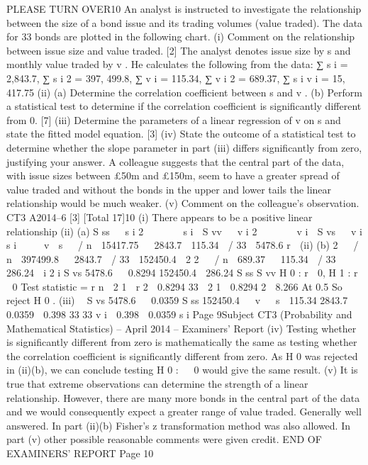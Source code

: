 PLEASE TURN OVER10
An analyst is instructed to investigate the relationship between the size of a bond issue
and its trading volumes (value traded). The data for 33 bonds are plotted in the
following chart.
(i)
Comment on the relationship between issue size and value traded.
[2]
The analyst denotes issue size by s and monthly value traded by v . He calculates the
following from the data:
∑ s i = 2,843.7, ∑ s i 2 = 397, 499.8, ∑ v i = 115.34, ∑ v i 2 = 689.37, ∑ s i v i = 15, 417.75
(ii)
(a) Determine the correlation coefficient between s and v .
(b) Perform a statistical test to determine if the correlation coefficient is
significantly different from 0.
[7]
(iii) Determine the parameters of a linear regression of v on s and state the fitted
model equation.
[3]
(iv) State the outcome of a statistical test to determine whether the slope parameter
in part (iii) differs significantly from zero, justifying your answer.
A colleague suggests that the central part of the data, with issue sizes between £50m
and £150m, seem to have a greater spread of value traded and without the bonds in
the upper and lower tails the linear relationship would be much weaker.
(v)
Comment on the colleague’s observation.
CT3 A2014–6
[3]
[Total 17]10
(i) There appears to be a positive linear relationship
(ii) (a)
S ss   s i 2   
   s i 
S vv   v i 2   
   v i 
S vs   v i s i     v  s   / n  15417.75   2843.7  115.34  / 33  5478.6
r 
(ii)
(b)
2 
 / n  397499.8   2843.7  / 33  152450.4

2
2 
 / n  689.37   115.34  / 33  286.24

i
2
i
S vs
5478.6

 0.8294
152450.4  286.24
S ss S vv
H 0 : r  0, H 1 : r  0
Test statistic = r
n  2
1  r
2

0.8294 33  2
1  0.8294
2
 8.266
At 0.5%
So reject H 0 .
(iii)

S vs
5478.6

 0.0359
S ss 152450.4
  v   s 
115.34
2843.7
 0.0359
 0.398
33
33
v i  0.398  0.0359 s i
Page 9Subject CT3 (Probability and Mathematical Statistics) – April 2014 – Examiners’ Report
(iv)
Testing whether  is significantly different from zero is mathematically the
same as testing whether the correlation coefficient is significantly different
from zero.
As H 0 was rejected in (ii)(b), we can conclude testing H 0 :   0 would give
the same result.
(v)
It is true that extreme observations can determine the strength of a linear
relationship. However, there are many more bonds in the central part of the
data and we would consequently expect a greater range of value traded.
Generally well answered. In part (ii)(b) Fisher’s z transformation method was also allowed.
In part (v) other possible reasonable comments were given credit.
END OF EXAMINERS’ REPORT
Page 10
